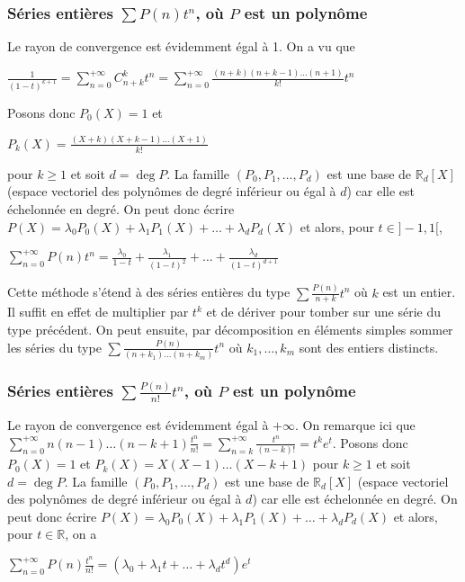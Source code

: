 \subsubsection{Séries entières $\sum P(n) t^n$, où $P$ est un polynôme}

Le rayon de convergence est évidemment égal à 1. On a vu que

$\frac{1}{(1-t)^{k+1}} = \sum_{n=0}^{+\infty} C_{n+k}^k t^n = \sum_{n=0}^{+\infty} \frac{(n+k)(n+k-1)\ldots(n+1)}{k!} t^n$

Posons donc $P_0(X) = 1$ et

$P_k(X) = \frac{(X+k)(X+k-1)\ldots(X+1)}{k!}$

pour $k \geq 1$ et soit $d = \deg P$. La famille $(P_0, P_1, \ldots, P_d)$ est une base de $\mathbb{R}_d[X]$ (espace vectoriel des polynômes de degré inférieur ou égal à $d$) car elle est échelonnée en degré. On peut donc écrire $P(X) = \lambda_0 P_0(X) + \lambda_1 P_1(X) + \ldots + \lambda_d P_d(X)$ et alors, pour $t \in ]-1,1[$,

$\sum_{n=0}^{+\infty} P(n) t^n = \frac{\lambda_0}{1-t} + \frac{\lambda_1}{(1-t)^2} + \ldots + \frac{\lambda_d}{(1-t)^{d+1}}$

\begin{rem}
Cette méthode s'étend à des séries entières du type $\sum \frac{P(n)}{n+k} t^n$ où $k$ est un entier. Il suffit en effet de multiplier par $t^k$ et de dériver pour tomber sur une série du type précédent. On peut ensuite, par décomposition en éléments simples sommer les séries du type $\sum \frac{P(n)}{(n+k_1)\ldots(n+k_m)} t^n$ où $k_1,\ldots,k_m$ sont des entiers distincts.
\end{rem}

\subsubsection{Séries entières $\sum \frac{P(n)}{n!} t^n$, où $P$ est un polynôme}

Le rayon de convergence est évidemment égal à $+\infty$. On remarque ici que $\sum_{n=0}^{+\infty} n(n-1)\ldots(n-k+1) \frac{t^n}{n!} = \sum_{n=k}^{+\infty} \frac{t^n}{(n-k)!} = t^k e^t$. Posons donc $P_0(X) = 1$ et $P_k(X) = X(X-1)\ldots(X-k+1)$ pour $k \geq 1$ et soit $d = \deg P$. La famille $(P_0, P_1, \ldots, P_d)$ est une base de $\mathbb{R}_d[X]$ (espace vectoriel des polynômes de degré inférieur ou égal à $d$) car elle est échelonnée en degré. On peut donc écrire $P(X) = \lambda_0 P_0(X) + \lambda_1 P_1(X) + \ldots + \lambda_d P_d(X)$ et alors, pour $t \in \mathbb{R}$, on a

$\sum_{n=0}^{+\infty} P(n) \frac{t^n}{n!} = (\lambda_0 + \lambda_1 t + \ldots + \lambda_d t^d) e^t$